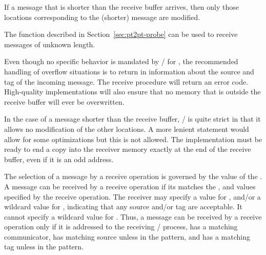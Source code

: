 If a
message that is shorter than the receive buffer arrives, then only those
locations corresponding to the (shorter) message are modified.

\begin{users}
The  function described in
Section~\ref{sec:pt2pt-probe} can be used to receive messages of
unknown length.
\end{users}

\begin{implementors}
Even though no specific behavior is mandated by \MPI/ for , the
recommended handling of overflow situations is to return in
 information about the
source and tag of the incoming message.  The receive procedure will return an
error code.  High-quality implementations will also ensure that no memory
that is outside the receive buffer will ever be overwritten.

In the case of a message shorter than the receive buffer, \MPI/ is
quite strict in that it allows no modification of the other locations.
A more lenient statement would allow for some
optimizations but this is not allowed.  The implementation must be ready to
end a copy into the receiver memory exactly at the end of the receive
buffer, even if it is an odd address.
\end{implementors}


The selection of a message by a receive operation is governed by
the value of the .
A message can be received by a receive operation
if its  matches the ,  and
 values specified by the
receive operation.  The receiver may specify a 
value for , and/or
a wildcard 
value for ,
indicating that any source and/or tag are acceptable.  It cannot specify a
wildcard value for .
Thus, a message can be received by a receive
operation only if it is addressed
to the receiving \MPI/ process, has a matching communicator, has
matching source unless
\mpicode{ = }
in the pattern, and has a matching tag unless
\mpicode{ = }
in the pattern.

